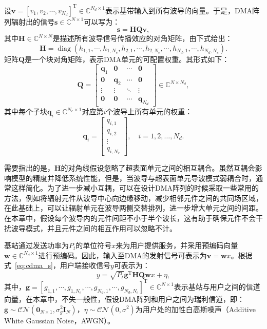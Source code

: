 设$\bm{v} = [v_1, v_2, \cdots, v_{N_d}]^\mathrm{T} \in \mathbb{C}^{N_d \times 1}$表示基带输入到所有波导的向量。于是，DMA阵列辐射出的信号$\bm s \in \mathbb{C}^{N \times 1}$可以写为：
\begin{equation}\label{eq:cdma_s}
	\bm s=\bm{H Q v},
\end{equation}
其中$\bm H \in \mathbb{C}^{N \times N}$是描述所有波导信号传播效应的对角矩阵，由下式给出：
\begin{equation}\label{eq:cdma_H}
	\bm{H} = \operatorname{diag}\left( h_{1,1}, \cdots, h_{1,N_e}, h_{2,1}, \cdots, h_{2,N_e}, \cdots, h_{N_d,1}, \cdots, h_{N_d,N_e} \right).
\end{equation}
矩阵$\bm{Q}$是一个块对角矩阵，表示DMA单元的可配置权重。其形式如下：
\begin{equation}\label{eq:cdma_Q}
	\bm{Q} = 
	\begin{bmatrix}
		\bm{q}_1 & \bm{0} & \cdots & \bm{0} \\
		\bm{0} & \bm{q}_2 & \cdots & \bm{0} \\
		\vdots & \vdots & \ddots & \vdots \\
		\bm{0} & \bm{0} & \cdots & \bm{q}_{N_d}
	\end{bmatrix}
	\in \mathbb{C}^{N \times N_d},
\end{equation}
其中每个子块$\bm{q}_i \in \mathbb{C}^{N_e \times 1}$对应第$i$个波导上所有单元的权重：
\begin{equation}
	\bm{q}_i = 
	\begin{bmatrix}
		q_{i,1} \\
		q_{i,2} \\
		\vdots \\
		q_{i,N_e}
	\end{bmatrix},
	\quad i = 1,2,\ldots,N_d.
\end{equation}

需要指出的是，$\bm H$的对角线假设忽略了超表面单元之间的相互耦合。虽然互耦会影响模型的精度并降低系统性能，但是，当波导与超表面单元导波模式弱耦合时，通常这样简化\cite{smith2017analysis}。为了进一步减小互耦，可以在设计DMA阵列的时候采取一些常用的方法，例如将辐射元件从波导中心向边缘移动，减少相邻元件之间的共同场区域，在此基础上，可以让辐射单元在波导两侧交替排列，进一步增大单元之间的间距。在本章中，假设每个波导内的元件间距不小于半个波长，这有助于确保元件不会干扰波导模式，并且元件之间的相互作用可以忽略不计。

基站通过发送功率为$P_t$的单位符号$x$来为用户提供服务，并采用预编码向量$\bm w \in \mathbb{C}^{N_d \times 1}$进行预编码。因此，输入至DMA的发射信号可表示为$\bm v = \bm w x$。根据式~\eqref{eq:cdma_s}，用户端接收信号$y$可表示为：
\begin{equation}
	y=\sqrt{P_{t}}\bm{g}^\mathrm{T} \bm{HQw} x + \eta,
\end{equation}
其中，$\bm g =[g_{1,1}, \cdots, g_{1,N_e}, \cdots, g_{N_d,1}, \cdots, g_{N_d,N_e}]^\mathrm{T} \in \mathbb{C}^{N \times 1}$表示基站与用户之间的信道向量，在本章中，不失一般性，假设DMA阵列和用户之间为瑞利信道，即：$\bm g \sim \mathcal{CN}(\bm 0_{N\times1}, \sigma_g^2 \bm I_N)$，$\eta \sim \mathcal{CN}(0, \sigma^2)$为用户处的加性白高斯噪声（Additive White Gaussian Noise，AWGN）。

